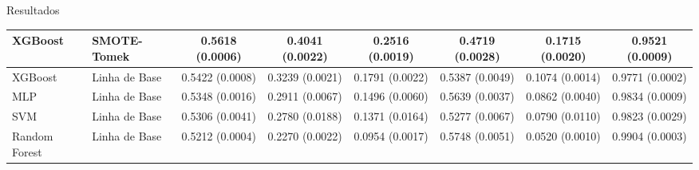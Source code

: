 \begin{frame}{Resultados}
\begin{table}[h]
{\begin{tabular}{|l|l|c|c|c|c|c|c|}
        \hline
        XGBoost & SMOTE-Tomek & 0.5618 (0.0006) & 0.4041 (0.0022) & 0.2516 (0.0019) & 0.4719 (0.0028) & 0.1715 (0.0020) & 0.9521 (0.0009) \\
        \hline
        XGBoost & Linha de Base & 0.5422 (0.0008) & 0.3239 (0.0021) & 0.1791 (0.0022) & 0.5387 (0.0049) & 0.1074 (0.0014) & 0.9771 (0.0002) \\
        \hline
        MLP & Linha de Base & 0.5348 (0.0016) & 0.2911 (0.0067) & 0.1496 (0.0060) & 0.5639 (0.0037) & 0.0862 (0.0040) & 0.9834 (0.0009) \\
        \hline
        SVM & Linha de Base & 0.5306 (0.0041) & 0.2780 (0.0188) & 0.1371 (0.0164) & 0.5277 (0.0067) & 0.0790 (0.0110) & 0.9823 (0.0029) \\
        \hline
        Random Forest & Linha de Base & 0.5212 (0.0004) & 0.2270 (0.0022) & 0.0954 (0.0017) & 0.5748 (0.0051) & 0.0520 (0.0010) & 0.9904 (0.0003) \\
        \hline
      \end{tabular}%
    }
  \end{table}
  \normalsize
\end{frame}

